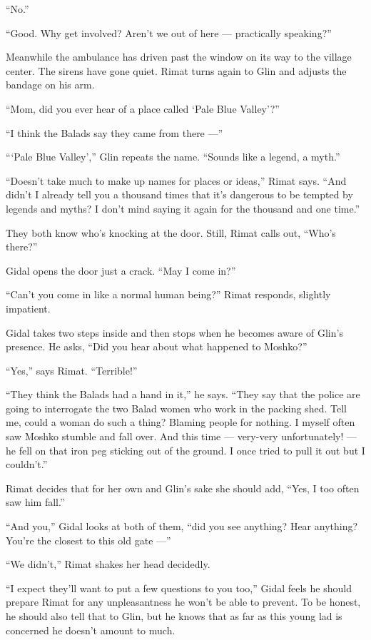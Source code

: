 \documentclass[twoside,11pt,openany]{book}
\begin{document}
``No.''

``Good. Why get involved? Aren't we out of here --- practically speaking?''

Meanwhile the ambulance has driven past the window on its way to the village center. The sirens have gone quiet. Rimat
turns again to Glin and adjusts the bandage on his arm.

``Mom, did you ever hear of a place called `Pale Blue Valley'?''

``I think the Balads say they came from there ---''

``{\thinspace}`Pale Blue Valley','' Glin repeats the name. ``Sounds like a legend, a
myth.''

``Doesn't take much to make up names for places or ideas,'' Rimat says. ``And
didn't I already tell you a thousand times that it's dangerous to be tempted by legends and myths? I don't mind saying
it again for the thousand and one time.''

They both know who's knocking at the door. Still, Rimat calls out, ``Who's there?''

Gidal opens the door just a crack. ``May I come in?''

``Can't you come in like a normal human being?'' Rimat responds, slightly
impatient.

Gidal takes two steps inside and then stops when he becomes aware of Glin's presence. He asks, ``Did you
hear about what happened to Moshko?''

``Yes,'' says Rimat. ``Terrible!''

``They think the Balads had a hand in it,'' he says. ``They say that the police
are going to interrogate the two Balad women who work in the packing shed. Tell me, could a woman do such a thing?
Blaming people for nothing. I myself often saw Moshko stumble and fall over. And this time --- very-very unfortunately!
--- he fell on that iron peg sticking out of the ground. I once tried to pull it out but I couldn't.''

Rimat decides that for her own and Glin's sake she should add, ``Yes, I too often saw him
fall.''

``And you,'' Gidal looks at both of them, ``did you see anything? Hear anything?
You're the closest to this old gate ---''

``We didn't,'' Rimat shakes her head decidedly.

``I expect they'll want to put a few questions to you too,'' Gidal feels he should prepare
Rimat for any unpleasantness he won't be able to prevent. To be honest, he should also tell that to Glin, but he knows
that as far as this young lad is concerned he doesn't amount to much.
\end{document}
